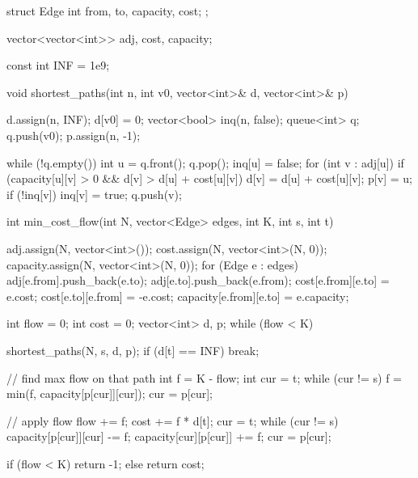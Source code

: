 struct Edge { int from, to, capacity, cost; };

vector<vector<int>> adj, cost, capacity;

const int INF = 1e9;

void shortest_paths(int n, int v0, vector<int>& d, vector<int>& p) {
    d.assign(n, INF);
    d[v0] = 0;
    vector<bool> inq(n, false);
    queue<int> q;
    q.push(v0);
    p.assign(n, -1);

    while (!q.empty()) {
        int u = q.front();
        q.pop();
        inq[u] = false;
        for (int v : adj[u]) {
            if (capacity[u][v] > 0 && d[v] > d[u] + cost[u][v]) {
                d[v] = d[u] + cost[u][v];
                p[v] = u;
                if (!inq[v]) {
                    inq[v] = true;
                    q.push(v);
                }
            }
        }
    }
}

int min_cost_flow(int N, vector<Edge> edges, int K, int s, int t) {
    adj.assign(N, vector<int>());
    cost.assign(N, vector<int>(N, 0));
    capacity.assign(N, vector<int>(N, 0));
    for (Edge e : edges) {
        adj[e.from].push_back(e.to);
        adj[e.to].push_back(e.from);
        cost[e.from][e.to] = e.cost;
        cost[e.to][e.from] = -e.cost;
        capacity[e.from][e.to] = e.capacity;
    }

    int flow = 0;
    int cost = 0;
    vector<int> d, p;
    while (flow < K) {
        shortest_paths(N, s, d, p);
        if (d[t] == INF)
            break;

        // find max flow on that path
        int f = K - flow;
        int cur = t;
        while (cur != s) {
            f = min(f, capacity[p[cur]][cur]);
            cur = p[cur];
        }

        // apply flow
        flow += f;
        cost += f * d[t];
        cur = t;
        while (cur != s) {
            capacity[p[cur]][cur] -= f;
            capacity[cur][p[cur]] += f;
            cur = p[cur];
        }
    }

    if (flow < K)
        return -1;
    else
        return cost;
}